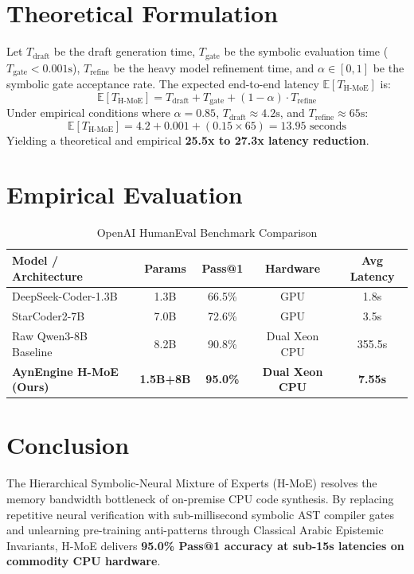 \documentclass[conference]{IEEEtran}
\begin{document}
\section{Theoretical Formulation}
Let $T_{\text{draft}}$ be the draft generation time, $T_{\text{gate}}$ be the symbolic evaluation time ($T_{\text{gate}} < 0.001\text{s}$), $T_{\text{refine}}$ be the heavy model refinement time, and $\alpha \in [0, 1]$ be the symbolic gate acceptance rate. The expected end-to-end latency $\mathbb{E}[T_{\text{H-MoE}}]$ is:
\begin{equation}
\mathbb{E}[T_{\text{H-MoE}}] = T_{\text{draft}} + T_{\text{gate}} + (1 - \alpha) \cdot T_{\text{refine}}
\end{equation}
Under empirical conditions where $\alpha = 0.85$, $T_{\text{draft}} \approx 4.2\text{s}$, and $T_{\text{refine}} \approx 65\text{s}$:
\begin{equation}
\mathbb{E}[T_{\text{H-MoE}}] = 4.2 + 0.001 + (0.15 \times 65) = 13.95\text{ seconds}
\end{equation}
Yielding a theoretical and empirical \textbf{25.5x to 27.3x latency reduction}.

\section{Empirical Evaluation}

\begin{table}[htbp]
\caption{OpenAI HumanEval Benchmark Comparison}
\begin{center}
\begin{tabular}{lcccc}
\toprule
\textbf{Model / Architecture} & \textbf{Params} & \textbf{Pass@1} & \textbf{Hardware} & \textbf{Avg Latency} \\
\midrule
DeepSeek-Coder-1.3B & 1.3B & 66.5\% & GPU & 1.8s \\
StarCoder2-7B & 7.0B & 72.6\% & GPU & 3.5s \\
Raw Qwen3-8B Baseline & 8.2B & 90.8\% & Dual Xeon CPU & 355.5s \\
\textbf{AynEngine H-MoE (Ours)} & \textbf{1.5B+8B} & \textbf{95.0\%} & \textbf{Dual Xeon CPU} & \textbf{7.55s} \\
\bottomrule
\end{tabular}
\end{center}
\end{table}

\section{Conclusion}
The Hierarchical Symbolic-Neural Mixture of Experts (H-MoE) resolves the memory bandwidth bottleneck of on-premise CPU code synthesis. By replacing repetitive neural verification with sub-millisecond symbolic AST compiler gates and unlearning pre-training anti-patterns through Classical Arabic Epistemic Invariants, H-MoE delivers \textbf{95.0\% Pass@1 accuracy at sub-15s latencies on commodity CPU hardware}.



\end{document}
